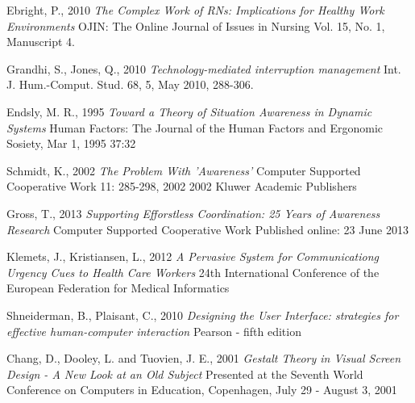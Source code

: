 \documentclass[b5paper, 11pt, norsk]{MScthesisITEM}
\begin{document}
\begin{thebibliography}{99}
Ebright, P., 2010
\emph {The Complex Work of RNs: Implications for Healthy Work Environments}
OJIN: The Online Journal of Issues in Nursing Vol. 15, No. 1, Manuscript 4.

Grandhi, S., Jones, Q., 2010
\emph {Technology-mediated interruption management} Int. J. Hum.-Comput. Stud. 68, 5, May 2010, 288-306.

Endsly, M. R., 1995
\emph{Toward a Theory of Situation Awareness in Dynamic Systems}
Human Factors: The Journal of the Human Factors and Ergonomic Sosiety, Mar 1, 1995 37:32

Schmidt, K., 2002
\emph{The Problem With 'Awareness'}
Computer Supported Cooperative Work 11: 285-298, 2002
2002 Kluwer Academic Publishers

Gross, T., 2013
\emph{Supporting Efforstless Coordination: 25 Years of Awareness Research}
Computer Supported Cooperative Work
Published online: 23 June 2013

Klemets, J., Kristiansen, L., 2012
\emph{A Pervasive System for Communicationg Urgency Cues to Health Care Workers}
24th International Conference of the European Federation for Medical Informatics

Shneiderman, B., Plaisant, C., 2010
\emph{Designing the User Interface: strategies for effective human-computer interaction}
Pearson - fifth edition

Chang, D., Dooley, L. and Tuovien, J. E., 2001
\emph{Gestalt Theory in Visual Screen Design - A New Look at an Old Subject}
Presented at the Seventh World Conference on Computers in Education, Copenhagen, July 29 - August 3, 2001

\end{thebibliography}

\end{document}
